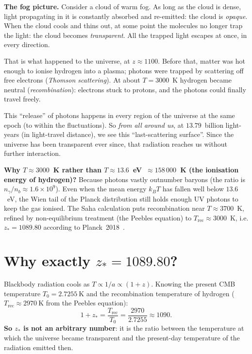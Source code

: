 \documentclass[11pt,a4paper,openany]{report}
\begin{document}
\begin{tcolorbox}[plain]
\textbf{The fog picture.} Consider a cloud of warm fog. As long as the cloud is
dense, light propagating in it is constantly absorbed and re-emitted: the cloud
is \emph{opaque}. When the cloud cools and thins out, at some point the
molecules no longer trap the light: the cloud becomes \emph{transparent}. All
the trapped light escapes at once, in every direction.

\medskip
That is what happened to the universe, at $z \approx 1100$. Before that, matter
was hot enough to ionise hydrogen into a plasma; photons were trapped by
scattering off free electrons (\emph{Thomson scattering}). At about
$T = 3000$~K hydrogen became neutral (\emph{recombination}): electrons stuck to
protons, and the photons could finally travel freely.

\medskip
This “release” of photons happens in every region of the universe at the same
epoch (to within the fluctuations). So \emph{from all around us}, at
$13.79$~billion light-years (in light-travel distance), we see this
“last-scattering surface”. Since the universe has been transparent ever
since, that radiation reaches us without further interaction.
\end{tcolorbox}

\begin{tcolorbox}[undergrad]
\textbf{Why $T \approx 3000$~K rather than $T \approx 13.6$~eV~$\approx 158\,000$~K
(the ionisation energy of hydrogen)?} Because photons vastly outnumber baryons
(the ratio is $n_{\gamma}/n_b \approx 1.6\times 10^{9}$). Even when the mean
energy $k_B T$ has fallen well below $13.6$~eV, the Wien tail of the Planck
distribution still holds enough UV photons to keep the gas ionised. The Saha
calculation puts recombination near $T \approx 3700$~K, refined by
non-equilibrium treatment (the Peebles equation) to
$T_{\text{rec}} \approx 3000$~K, i.e. $z_{*} = 1089.80$ according to
Planck~2018~\cite{Planck2018}.
\end{tcolorbox}

\section{Why exactly $z_{*} = 1089.80$?}

Blackbody radiation cools as $T \propto 1/a \propto (1+z)$. Knowing the present
CMB temperature $T_{0} = \SI{2.7255}{\kelvin}$ and the recombination
temperature of hydrogen ($T_{\text{rec}} \approx \SI{2970}{\kelvin}$ from the
Peebles equation):
\[
1 + z_{*} = \frac{T_{\text{rec}}}{T_{0}}
          = \frac{\num{2970}}{\num{2.7255}} \approx 1090.
\]
\textbf{So $z_{*}$ is not an arbitrary number}: it is the ratio between the
temperature at which the universe became transparent and the present-day
temperature of the radiation emitted then.
\end{document}
